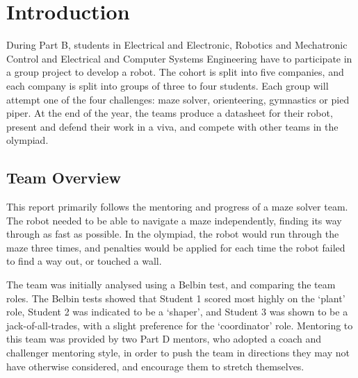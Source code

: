 
\section{Introduction}\label{sec:introduction}
    During Part B, students in Electrical and Electronic, Robotics and Mechatronic Control and Electrical and Computer Systems Engineering have to participate in a group project to develop a robot.
    The cohort is split into five companies, and each company is split into groups of three to four students.
    Each group will attempt one of the four challenges: maze solver, orienteering, gymnastics or pied piper.
    At the end of the year, the teams produce a datasheet for their robot, present and defend their work in a viva, and compete with other teams in the olympiad.

    \subsection{Team Overview}\label{subsec:intro-team}
    This report primarily follows the mentoring and progress of a maze solver team.
    The robot needed to be able to navigate a maze independently, finding its way through as fast as possible.
    In the olympiad, the robot would run through the maze three times, and penalties would be applied for each time the robot failed to find a way out, or touched a wall.

    The team was initially analysed using a Belbin test, and comparing the team roles. %
    The Belbin tests showed that Student 1 scored most highly on the `plant' role, Student 2 was indicated to be a `shaper', and Student 3 was shown to be a jack-of-all-trades, with a slight preference for the `coordinator' role.
    Mentoring to this team was provided by two Part D mentors, who adopted a coach and challenger mentoring style, in order to push the team in directions they may not have otherwise considered, and encourage them to stretch themselves.
%
%
%
